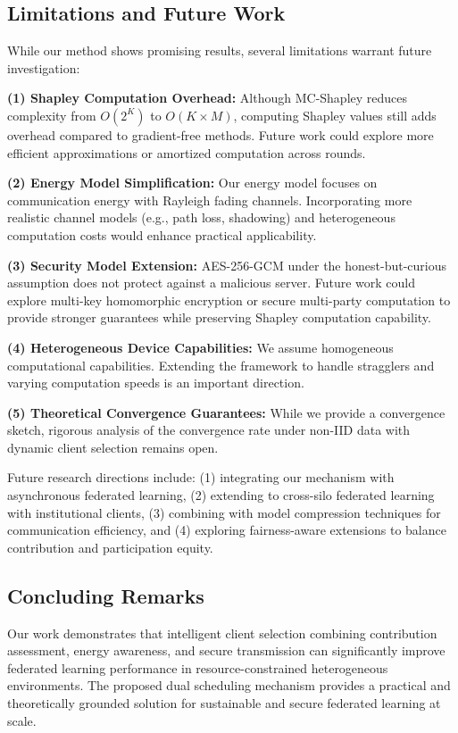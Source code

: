 \subsection{Limitations and Future Work}

While our method shows promising results, several limitations warrant future investigation:

\textbf{(1) Shapley Computation Overhead:} Although MC-Shapley reduces complexity from $O(2^K)$ to $O(K \times M)$, computing Shapley values still adds overhead compared to gradient-free methods. Future work could explore more efficient approximations or amortized computation across rounds.

\textbf{(2) Energy Model Simplification:} Our energy model focuses on communication energy with Rayleigh fading channels. Incorporating more realistic channel models (e.g., path loss, shadowing) and heterogeneous computation costs would enhance practical applicability.

\textbf{(3) Security Model Extension:} AES-256-GCM under the honest-but-curious assumption does not protect against a malicious server. Future work could explore multi-key homomorphic encryption or secure multi-party computation to provide stronger guarantees while preserving Shapley computation capability.

\textbf{(4) Heterogeneous Device Capabilities:} We assume homogeneous computational capabilities. Extending the framework to handle stragglers and varying computation speeds is an important direction.

\textbf{(5) Theoretical Convergence Guarantees:} While we provide a convergence sketch, rigorous analysis of the convergence rate under non-IID data with dynamic client selection remains open.

Future research directions include: (1) integrating our mechanism with asynchronous federated learning, (2) extending to cross-silo federated learning with institutional clients, (3) combining with model compression techniques for communication efficiency, and (4) exploring fairness-aware extensions to balance contribution and participation equity.

\subsection{Concluding Remarks}

Our work demonstrates that intelligent client selection combining contribution assessment, energy awareness, and secure transmission can significantly improve federated learning performance in resource-constrained heterogeneous environments. The proposed dual scheduling mechanism provides a practical and theoretically grounded solution for sustainable and secure federated learning at scale.
